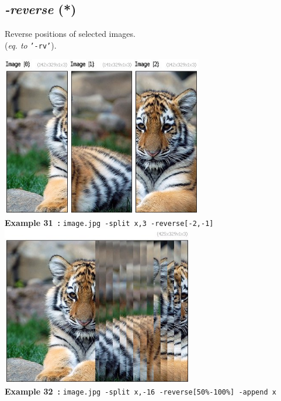 \documentclass[a4paper,11pt,twoside]{book}
\begin{document}
\subsection{\emph{-reverse} (*)}\vspace*{-0.5em}
Reverse positions of selected images.
~\\(\emph{eq. to} {\small \texttt{'-rv'}}).
\begin{center}\includegraphics[keepaspectratio=true,height=7cm,width=\textwidth]{img/gmic_def31.jpg}\\
{\footnotesize \textbf{Example 31~:} \texttt{image.jpg -split x,3 -reverse[-2,-1]}}
\\\includegraphics[keepaspectratio=true,height=7cm,width=\textwidth]{img/gmic_def32.jpg}\\
{\footnotesize \textbf{Example 32~:} \texttt{image.jpg -split x,-16 -reverse[50\%-100\%] -append x}}
\end{center}
\end{document}
